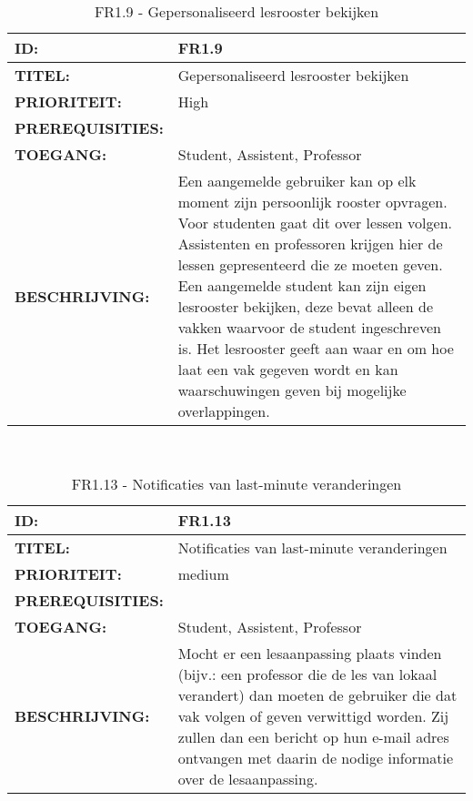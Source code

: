 \noindent\begin{table}[H]
            \begin{tabular}{l | p{10cm}}
                \textbf{ID:} & FR1.9 \\ \hline
                \textbf{TITEL:} & Gepersonaliseerd lesrooster bekijken\\ \hline
                \textbf{PRIORITEIT:} &  High \\ \hline
                \textbf{PREREQUISITIES:} & \\ \hline
                \textbf{TOEGANG:} &  Student, Assistent, Professor \\ \hline
                \textbf{BESCHRIJVING:} & Een aangemelde gebruiker kan op elk moment zijn persoonlijk rooster opvragen. Voor studenten gaat dit over lessen volgen. Assistenten en professoren krijgen hier de lessen gepresenteerd die ze moeten geven. Een aangemelde student kan zijn eigen lesrooster bekijken, deze bevat alleen de vakken waarvoor de student ingeschreven is. 
                                        Het lesrooster geeft aan waar en om hoe laat een vak gegeven wordt en kan waarschuwingen geven bij mogelijke overlappingen.\\ 
            \end{tabular}\\
            \caption{FR1.9  - Gepersonaliseerd lesrooster bekijken}
            \label{tab:FR1.9 - Gepersonaliseerd lesrooster bekijken}
        \end{table}

\noindent\begin{table}[H]
            \begin{tabular}{l | p{10cm}}
                \textbf{ID:} & FR1.13 \\ \hline
                \textbf{TITEL:} & Notificaties van last-minute veranderingen \\ \hline
                \textbf{PRIORITEIT:} &  medium \\ \hline
                \textbf{PREREQUISITIES:} & \\ \hline
                \textbf{TOEGANG:} & Student, Assistent, Professor \\ \hline
                \textbf{BESCHRIJVING:} & Mocht er een lesaanpassing plaats vinden (bijv.: een professor die de les van lokaal verandert) dan moeten de gebruiker die dat vak volgen of geven verwittigd worden. Zij zullen dan een bericht op hun e-mail adres ontvangen met daarin de nodige informatie over de lesaanpassing.\\
            \end{tabular}\\
            \caption{FR1.13 - Notificaties van last-minute veranderingen}
			\label{tab:FR1.13 - Notificaties van last-minute veranderingen}
        \end{table}      

